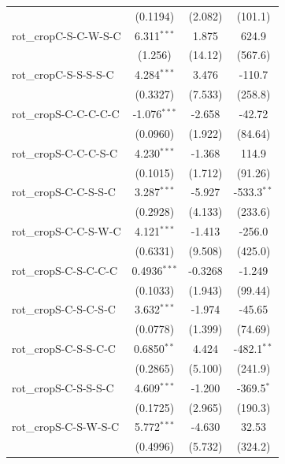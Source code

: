 \begin{tabular}{lccc}
                         & (0.1194)        & (2.082)      & (101.1)\\   
   rot\_cropC-S-C-W-S-C  & 6.311$^{***}$   & 1.875        & 624.9\\   
                         & (1.256)         & (14.12)      & (567.6)\\   
   rot\_cropC-S-S-S-S-C  & 4.284$^{***}$   & 3.476        & -110.7\\   
                         & (0.3327)        & (7.533)      & (258.8)\\   
   rot\_cropS-C-C-C-C-C  & -1.076$^{***}$  & -2.658       & -42.72\\   
                         & (0.0960)        & (1.922)      & (84.64)\\   
   rot\_cropS-C-C-C-S-C  & 4.230$^{***}$   & -1.368       & 114.9\\   
                         & (0.1015)        & (1.712)      & (91.26)\\   
   rot\_cropS-C-C-S-S-C  & 3.287$^{***}$   & -5.927       & -533.3$^{**}$\\   
                         & (0.2928)        & (4.133)      & (233.6)\\   
   rot\_cropS-C-C-S-W-C  & 4.121$^{***}$   & -1.413       & -256.0\\   
                         & (0.6331)        & (9.508)      & (425.0)\\   
   rot\_cropS-C-S-C-C-C  & 0.4936$^{***}$  & -0.3268      & -1.249\\   
                         & (0.1033)        & (1.943)      & (99.44)\\   
   rot\_cropS-C-S-C-S-C  & 3.632$^{***}$   & -1.974       & -45.65\\   
                         & (0.0778)        & (1.399)      & (74.69)\\   
   rot\_cropS-C-S-S-C-C  & 0.6850$^{**}$   & 4.424        & -482.1$^{**}$\\   
                         & (0.2865)        & (5.100)      & (241.9)\\   
   rot\_cropS-C-S-S-S-C  & 4.609$^{***}$   & -1.200       & -369.5$^{*}$\\   
                         & (0.1725)        & (2.965)      & (190.3)\\   
   rot\_cropS-C-S-W-S-C  & 5.772$^{***}$   & -4.630       & 32.53\\   
                         & (0.4996)        & (5.732)      & (324.2)\\   

\end{tabular}
